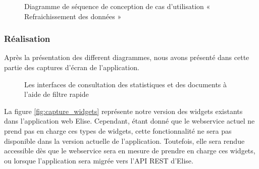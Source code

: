 \begin{figure}[H]
  \centering
  \caption{Diagramme de séquence de conception de cas d'utilisation « Refraichissement des données »}
  \label{fig:sequence_conception_refraichissement_donnees}
\end{figure}

\subsubsection{Réalisation}

Après la présentation des different diagrammes, nous avons présenté dans cette partie des captures d'écran de l'application.

\begin{figure}[H]
  \centering
  \caption{Les interfaces de consultation des statistiques et des documents à l'aide de filtre rapide}
  \label{fig:realisation_sprint7}
\end{figure}

La figure \ref{fig:capture_widgets} représente notre version des widgets existants dans l'application web Elise. Cependant, étant donné que le webservice actuel ne prend pas en charge ces types de widgets, cette fonctionnalité ne sera pas disponible dans la version actuelle de l'application. Toutefois, elle sera rendue accessible dès que le webservice sera en mesure de prendre en charge ces widgets, ou lorsque l'application sera migrée vers l'API REST d'Elise.\\

